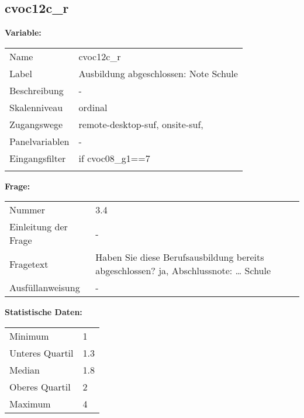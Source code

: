 	
	
	\subsection{cvoc12c\_r}
	\label{subSection:cvoc12c_r}

	\noindent\textbf{Variable:}\\
		\begin{tabular}{lL{11.3cm}}
			\label{tableVariable:cvoc12c_r}
			Name & cvoc12c\_r \\
			Label & Ausbildung abgeschlossen: Note Schule \\
			Beschreibung & - \\
			Skalenniveau & ordinal \\
			Zugangswege &
				remote-desktop-suf,
				onsite-suf,
 \\
			Panelvariablen & -
			 \\
			Eingangsfilter & if cvoc08\_g1==7 \\
 \\
		\end{tabular}

		\vspace*{1 cm}
		\noindent\textbf{Frage:}\\
		\begin{tabular}{lL{11.3cm}}
			\label{tableQuestion:cvoc12c_r}
			Nummer & 3.4 \\
			Einleitung der Frage & - \\
			Fragetext & Haben Sie diese Berufsausbildung bereits abgeschlossen?
ja, 
Abschlussnote:
… Schule \\
			Ausfüllanweisung & - \\
		\end{tabular}


		\vspace*{1 cm}
		\noindent\textbf{Statistische Daten:}\\
			\begin{tabular}{ll}
				\label{tableStatistics:cvoc12c_r}
					Minimum & 1 \\
					Unteres Quartil & 1.3 \\
					Median & 1.8 \\
					Oberes Quartil & 2 \\
					Maximum & 4 \\
			\end{tabular}



